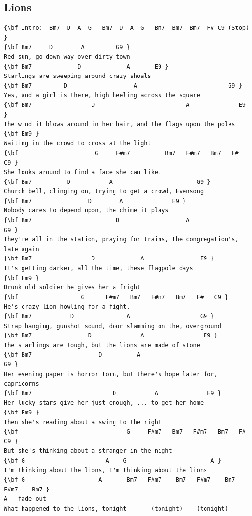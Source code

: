 \documentclass[a4paper]{article}
\begin{document}
\subsection{Lions}
\begin{Verbatim}[commandchars=\\\{\}]
{\bf Intro:  Bm7  D  A  G   Bm7  D  A  G   Bm7  Bm7  Bm7  F# C9 (Stop) }
{\bf Bm7     D        A         G9 }
Red sun, go down way over dirty town 
{\bf Bm7             D             A       E9 }
Starlings are sweeping around crazy shoals 
{\bf Bm7         D                   A                          G9 }
Yes, and a girl is there, high heeling across the square 
{\bf Bm7                 D                          A              E9 }
The wind it blows around in her hair, and the flags upon the poles 
{\bf Em9 }
Waiting in the crowd to cross at the light 
{\bf                      G     F#m7          Bm7   F#m7   Bm7   F#   C9 }
She looks around to find a face she can like. 
{\bf Bm7          D           A                        G9 }
Church bell, clinging on, trying to get a crowd, Evensong 
{\bf Bm7                D        A              E9 }
Nobody cares to depend upon, the chime it plays 
{\bf Bm7                        D                   A                   G9 }
They're all in the station, praying for trains, the congregation's, late again 
{\bf Bm7                 D             A                E9 }
It's getting darker, all the time, these flagpole days 
{\bf Em9 }
Drunk old soldier he gives her a fright 
{\bf                  G      F#m7   Bm7   F#m7   Bm7   F#   C9 }
He's crazy lion howling for a fight. 
{\bf Bm7           D               A                    G9 }
Strap hanging, gunshot sound, door slamming on the, overground 
{\bf Bm7                D              A                 E9 }
The starlings are tough, but the lions are made of stone 
{\bf Bm7                   D          A                               G9 }
Her evening paper is horror torn, but there's hope later for, capricorns 
{\bf Bm7                       D           A              E9 }
Her lucky stars give her just enough, ... to get her home 
{\bf Em9 }
Then she's reading about a swing to the right 
{\bf                               G     F#m7   Bm7   F#m7   Bm7   F#   C9 }
But she's thinking about a stranger in the night 
{\bf G                       A    G                        A }
I'm thinking about the lions, I'm thinking about the lions 
{\bf G                     A       Bm7   F#m7    Bm7   F#m7    Bm7   F#m7    Bm7 }
A   fade out 
What happened to the lions, tonight       (tonight)    (tonight) 

\end{Verbatim}
\newpage
\end{document}
